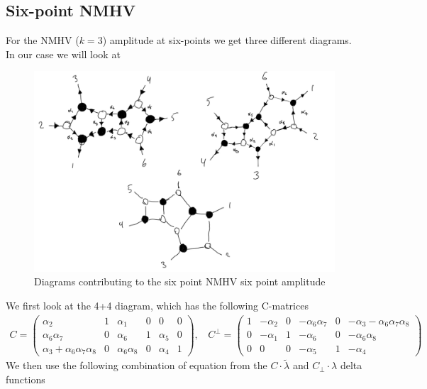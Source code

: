 \documentclass[letter,11pt]{article}
\begin{document}
\subsection{Six-point NMHV}
For the NMHV ($k=3$) amplitude at six-points we get three different diagrams. In our case we will look at
\begin{figure}[H]
	\centering
	\includegraphics[width=0.9\linewidth]{nmhv}
	\caption[]{Diagrams contributing to the six point NMHV six point amplitude}
	\label{fig:44}
\end{figure}
\noindent
We first look at the 4+4 diagram, which has the following C-matrices
\begin{equation}
	\begin{aligned}
		C=\begin{pmatrix}
			\alpha_2 & 1 & \alpha_1 & 0 & 0 & 0\\
			\alpha_6 \alpha_7 & 0 &\alpha_6 & 1 & \alpha_5 & 0\\
			\alpha_3+\alpha_6\alpha_7\alpha_8 & 0 & \alpha_6\alpha_8  & 0 & \alpha_4 & 1
		\end{pmatrix},~~~~	C^\perp=\begin{pmatrix}
		1 & -\alpha_2 & 0 &-\alpha_6 \alpha_7 & 0 & -\alpha_3-\alpha_6\alpha_7\alpha_8\\
		0  & -\alpha_1 & 1 & -\alpha_6 & 0 & -\alpha_6\alpha_8\\
		0 & 0 & 0  & -\alpha_5 & 1 & -\alpha_4
	\end{pmatrix}
	\end{aligned}
\end{equation}
We then use the following combination of equation from the $C\cdot\tilde \lambda$ and $C_\perp\cdot \lambda$ delta functions
\end{document}
